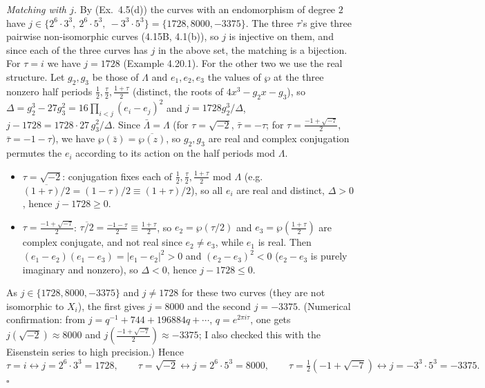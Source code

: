 \documentclass[11pt]{article}
\begin{document}
\emph{Matching with $j$.} By (Ex.~4.5(d)) the curves with an endomorphism of degree $2$ have $j\in\{2^6\cdot3^3,\ 2^6\cdot5^3,\ -3^3\cdot5^3\}=\{1728,8000,-3375\}$. The three $\tau$'s give three pairwise non-isomorphic curves (4.15B, 4.1(b)), so $j$ is injective on them, and since each of the three curves has $j$ in the above set, the matching is a bijection. For $\tau=i$ we have $j=1728$ (Example 4.20.1). For the other two we use the real structure. Let $g_2,g_3$ be those of $\Lambda$ and $e_1,e_2,e_3$ the values of $\wp$ at the three nonzero half periods $\frac12,\frac\tau2,\frac{1+\tau}2$ (distinct, the roots of $4x^3-g_2x-g_3$), so $\Delta=g_2^3-27g_3^2=16\prod_{i<j}(e_i-e_j)^2$ and $j=1728g_2^3/\Delta$, $j-1728=1728\cdot27\,g_3^2/\Delta$. Since $\bar\Lambda=\Lambda$ (for $\tau=\sqrt{-2}$, $\bar\tau=-\tau$; for $\tau=\frac{-1+\sqrt{-7}}2$, $\bar\tau=-1-\tau$), we have $\wp(\bar z)=\overline{\wp(z)}$, so $g_2,g_3$ are real and complex conjugation permutes the $e_i$ according to its action on the half periods mod $\Lambda$.
\begin{itemize}
\item $\tau=\sqrt{-2}$: conjugation fixes each of $\frac12,\frac\tau2,\frac{1+\tau}2$ mod $\Lambda$ (e.g.\ $\overline{(1+\tau)/2}=(1-\tau)/2\equiv(1+\tau)/2$), so all $e_i$ are real and distinct, $\Delta>0$, hence $j-1728\ge0$.
\item $\tau=\frac{-1+\sqrt{-7}}2$: $\overline{\tau/2}=\frac{-1-\tau}2\equiv\frac{1+\tau}2$, so $e_2=\wp(\tau/2)$ and $e_3=\wp(\frac{1+\tau}2)$ are complex conjugate, and not real since $e_2\ne e_3$, while $e_1$ is real. Then $(e_1-e_2)(e_1-e_3)=|e_1-e_2|^2>0$ and $(e_2-e_3)^2<0$ ($e_2-e_3$ is purely imaginary and nonzero), so $\Delta<0$, hence $j-1728\le0$.
\end{itemize}
As $j\in\{1728,8000,-3375\}$ and $j\neq1728$ for these two curves (they are not isomorphic to $X_i$), the first gives $j=8000$ and the second $j=-3375$. (Numerical confirmation: from $j=q^{-1}+744+196884q+\cdots$, $q=e^{2\pi i\tau}$, one gets $j(\sqrt{-2})\approx8000$ and $j(\frac{-1+\sqrt{-7}}2)\approx-3375$; I also checked this with the Eisenstein series to high precision.)
Hence
\[
\tau=i\leftrightarrow j=2^6\cdot3^3=1728,\qquad \tau=\sqrt{-2}\leftrightarrow j=2^6\cdot5^3=8000,\qquad \tau=\tfrac12(-1+\sqrt{-7})\leftrightarrow j=-3^3\cdot5^3=-3375.
\]
\hfill$\square$
\end{document}
